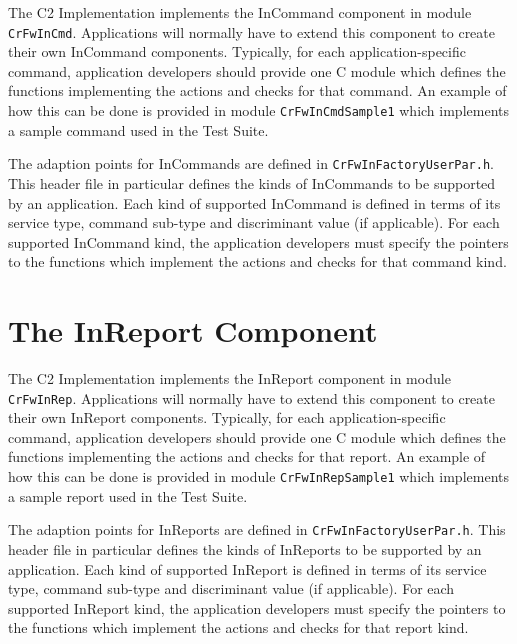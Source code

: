 \documentclass{pnp_article}
\begin{document}
The C2 Implementation implements the InCommand component in module \texttt{CrFwInCmd}. Applications will normally have to extend this component to create their own InCommand components. Typically, for each application-specific command, application developers should provide one C module which defines the functions implementing the actions and checks for that command. An example of how this can be done is provided in module \texttt{CrFwInCmdSample1} which implements a sample command used in the Test Suite.

The adaption points for InCommands are defined in \texttt{CrFwInFactoryUserPar.h}. This header file in particular defines the kinds of InCommands to be supported by an application. Each kind of supported InCommand is defined in terms of its service type, command sub-type and discriminant value (if applicable). For each supported InCommand kind, the application developers must specify the pointers to the functions which implement the actions and checks for that command kind.



\section{The InReport Component}\label{sec:InReport}


The C2 Implementation implements the InReport component in module \texttt{CrFwInRep}. Applications will normally have to extend this component to create their own InReport components. Typically, for each application-specific command, application developers should provide one C module which defines the functions implementing the actions and checks for that report. An example of how this can be done is provided in module \texttt{CrFwInRepSample1} which implements a sample report used in the Test Suite.

The adaption points for InReports are defined in \texttt{CrFwInFactoryUserPar.h}. This header file in particular defines the kinds of InReports to be supported by an application. Each kind of supported InReport is defined in terms of its service type, command sub-type and discriminant value (if applicable). For each supported InReport kind, the application developers must specify the pointers to the functions which implement the actions and checks for that report kind.
\end{document}
